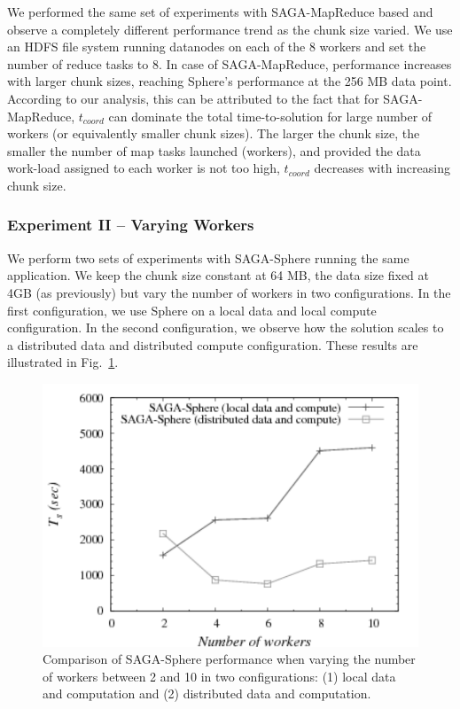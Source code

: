 \documentclass[graybox]{svmult}
\begin{document}
We performed the same set of experiments with SAGA-MapReduce based \wc
and observe a completely different performance trend as the chunk size
varied.  We use an HDFS file system running datanodes on each of the 8
workers and set the number of reduce tasks to 8.  In case of
SAGA-MapReduce, performance increases with larger chunk sizes,
reaching Sphere's performance at the 256 MB data point.  According to
our analysis, this can be attributed to the fact that for
SAGA-MapReduce, $t_{coord}$ can dominate the total time-to-solution
for large number of workers (or equivalently smaller chunk sizes).
The larger the chunk size, the smaller the number of map tasks
launched (workers), and provided the data work-load assigned to each
worker is not too high, $t_{coord}$ decreases with increasing chunk
size.


\subsubsection{Experiment II -- Varying Workers}

We perform two sets of experiments with SAGA-Sphere running the same
\wc application.  We keep the chunk size constant at 64 MB, the data
size fixed at 4GB (as previously) but vary the number of workers in
two configurations. In the first configuration, we use Sphere on a
local data and local compute configuration. In the second
configuration, we observe how the solution scales to a distributed
data and distributed compute configuration. These results are
illustrated in Fig.~\ref{fig:sphere_varying_workers}.  

\begin{figure}[htb!]
 \includegraphics[width=1.0\textwidth]{figures/sphere_varying_workers-gray.pdf}
 \caption{
   Comparison of SAGA-Sphere performance when varying the number of workers
   between 2 and 10 in two configurations: (1) local data and computation
   and (2) distributed data and computation.
   \label{fig:sphere_varying_workers}
   }
\end{figure}
\end{document}
